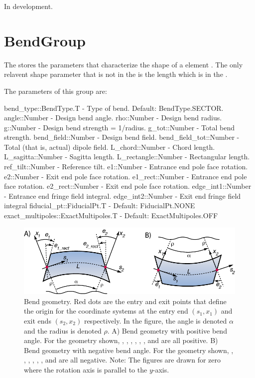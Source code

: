 In development.

\section{BendGroup}
\label{s:bend.g}

The  stores the parameters that characterize the shape of a  element
. The only relavent shape parameter that is not in the  is the
length  which is in the .

The parameters of this group are:
\begin{example}
  bend_type::BendType.T     - Type of bend. Default: BendType.SECTOR.
  angle::Number             - Design bend angle.
  rho::Number               - Design bend radius.
  g::Number                 - Design bend strength = 1/radius.
  g_tot::Number             - Total bend strength.
  bend_field::Number        - Design bend field.
  bend_field_tot::Number    - Total (that is, actual) dipole field.
  L_chord::Number           - Chord length.
  L_sagitta::Number         - Sagitta length.
  L_rectangle::Number       - Rectangular length.
  ref_tilt::Number          - Reference tilt.
  e1::Number                - Entrance end pole face rotation.
  e2::Number                - Exit end pole face rotation.
  e1_rect::Number           - Entrance end pole face rotation.
  e2_rect::Number           - Exit end pole face rotation.
  edge_int1::Number         - Entrance end fringe field integral.
  edge_int2::Number         - Exit end fringe field integral
  fiducial_pt::FiducialPt.T            - Default: FiducialPt.NONE
  exact_multipoles::ExactMultipoles.T  - Default: ExactMultipoles.OFF
\end{example}

\begin{figure}[ht]
{\centering 
\includegraphics{bend.pdf} 
\caption[Bend geometry]{
Bend geometry. Red dots are the entry and exit points that define the origin for the
coordinate systems at the entry end $(s_1, x_1)$ and exit ends $(s_2, x_2)$ respectively. 
In the figure, the angle  is denoted $\alpha$ and the radius
 is denoted $\rho$.
A) Bend geometry with positive bend angle. For the geometry shown, 
, , , , , , and  are all positive.
B) Bend geometry with negative bend angle. For the geometry shown, 
, , , , , , and  are all negative.
Note: The figures are drawn for zero  where the rotation axis is parallel to the 
$y$-axis. 
}
\label{f:bend}
}
\end{figure}

